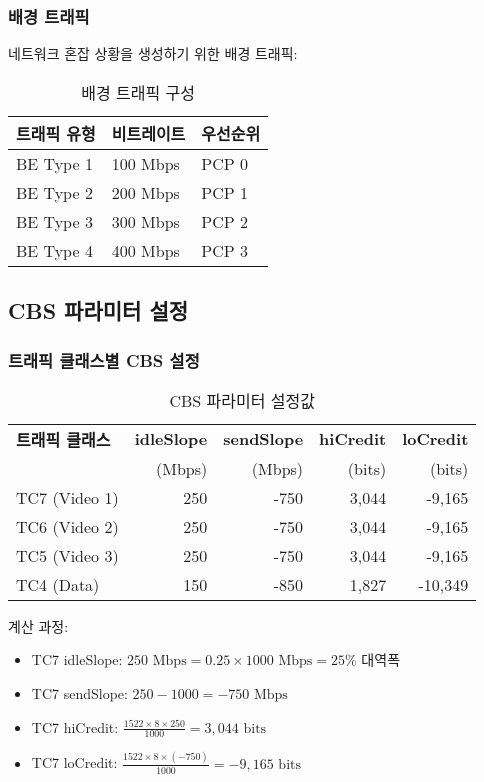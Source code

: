 \documentclass[twocolumn,10pt]{article}
\begin{document}
\subsubsection{배경 트래픽}

네트워크 혼잡 상황을 생성하기 위한 배경 트래픽:

\begin{table}[h]
\centering
\caption{배경 트래픽 구성}
\label{tab:background_traffic}
\begin{tabular}{lll}
\toprule
\textbf{트래픽 유형} & \textbf{비트레이트} & \textbf{우선순위} \\
\midrule
BE Type 1 & 100 Mbps & PCP 0 \\
BE Type 2 & 200 Mbps & PCP 1 \\
BE Type 3 & 300 Mbps & PCP 2 \\
BE Type 4 & 400 Mbps & PCP 3 \\
\bottomrule
\end{tabular}
\end{table}

\subsection{CBS 파라미터 설정}

\subsubsection{트래픽 클래스별 CBS 설정}

\begin{table}[h]
\centering
\caption{CBS 파라미터 설정값}
\label{tab:cbs_parameters}
\begin{tabular}{lrrrr}
\toprule
\textbf{트래픽 클래스} & \textbf{idleSlope} & \textbf{sendSlope} & \textbf{hiCredit} & \textbf{loCredit} \\
 & (Mbps) & (Mbps) & (bits) & (bits) \\
\midrule
TC7 (Video 1) & 250 & -750 & 3,044 & -9,165 \\
TC6 (Video 2) & 250 & -750 & 3,044 & -9,165 \\
TC5 (Video 3) & 250 & -750 & 3,044 & -9,165 \\
TC4 (Data) & 150 & -850 & 1,827 & -10,349 \\
\bottomrule
\end{tabular}
\end{table}

계산 과정:
\begin{itemize}
    \item TC7 idleSlope: $250 \text{ Mbps} = 0.25 \times 1000 \text{ Mbps} = 25\%$ 대역폭
    \item TC7 sendSlope: $250 - 1000 = -750 \text{ Mbps}$
    \item TC7 hiCredit: $\frac{1522 \times 8 \times 250}{1000} = 3,044 \text{ bits}$
    \item TC7 loCredit: $\frac{1522 \times 8 \times (-750)}{1000} = -9,165 \text{ bits}$
\end{itemize}
\end{document}
